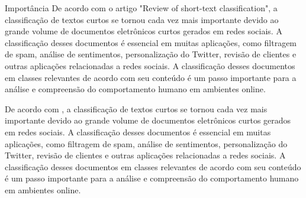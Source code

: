
Importância
De acordo com o artigo "Review of short-text classification", a classificação de textos curtos se tornou cada vez mais importante devido ao grande volume de documentos eletrônicos curtos gerados em redes sociais. A classificação desses documentos é essencial em muitas aplicações, como filtragem de spam, análise de sentimentos, personalização do Twitter, revisão de clientes e outras aplicações relacionadas a redes sociais. A classificação desses documentos em classes relevantes de acordo com seu conteúdo é um passo importante para a análise e compreensão do comportamento humano em ambientes online. 

De acordo com \cite{alsmadi2019review}, a classificação de textos curtos se tornou cada vez mais importante devido ao grande volume de documentos eletrônicos curtos gerados em redes sociais. A classificação desses documentos é essencial em muitas aplicações, como filtragem de spam, análise de sentimentos, personalização do Twitter, revisão de clientes e outras aplicações relacionadas a redes sociais. A classificação desses documentos em classes relevantes de acordo com seu conteúdo é um passo importante para a análise e compreensão do comportamento humano em ambientes online.

